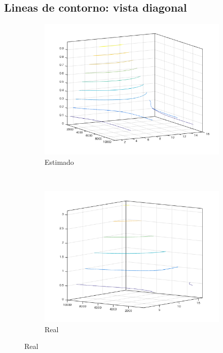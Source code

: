 \documentclass[12pt,letterpaper]{article}
\begin{document}
\newpage
\subsection{Lineas de contorno: vista diagonal}
\begin{figure}[!h]
        \centering
        \begin{subfigure}[h]{0.45\textwidth}
                \includegraphics[width=\textwidth]{estimado_diagonal}
                \caption{Estimado}
                \label{fig:gull}
        \end{subfigure}
        ~
        \begin{subfigure}[h]{0.45\textwidth}
                \includegraphics[width=\textwidth]{real_diagonal}
                \caption{Real}
                \label{fig:tiger}
        \end{subfigure}
\end{figure}
\end{document}
